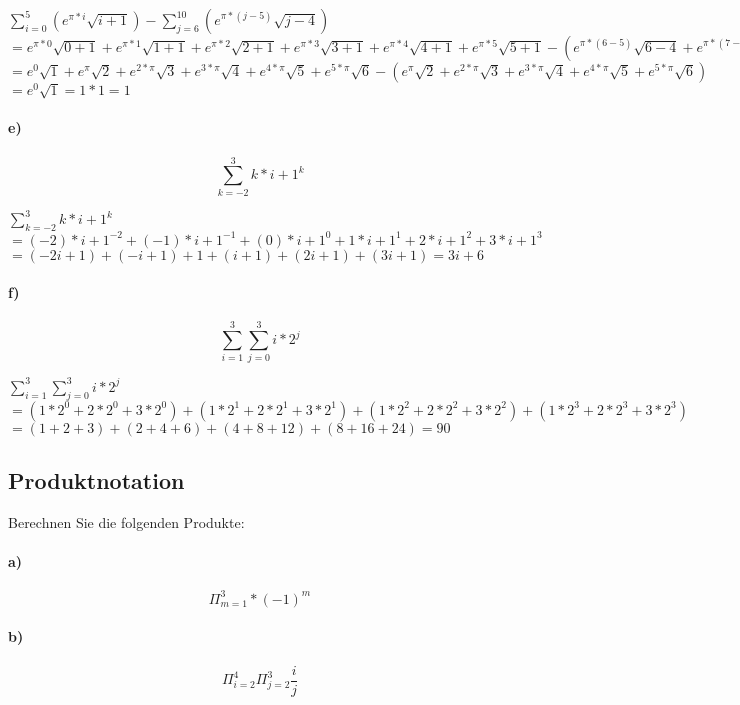 \documentclass[paper=a4, fontsize=11pt]{scrartcl}
\numberwithin{equation}{section}
\numberwithin{figure}{section}
\numberwithin{table}{section}
\begin{document}
$\sum^{5}_{i=0}(e^{\pi *i} \sqrt{i+1})-\sum^{10}_{j=6}(e^{\pi *(j-5)} \sqrt{j-4})$ \\
$=
e^{\pi *0} \sqrt{0+1} + e^{\pi *1} \sqrt{1+1}
+ e^{\pi *2} \sqrt{2+1} + e^{\pi *3} \sqrt{3+1}
+ e^{\pi *4} \sqrt{4+1} + e^{\pi *5} \sqrt{5+1} 
- (e^{\pi *(6-5)} \sqrt{6-4} + e^{\pi *(7-5)} \sqrt{7-4} + e^{\pi *(8-5)} \sqrt{8-4} 
+ e^{\pi *(9-5)} \sqrt{9-4} + e^{\pi *(10-5)} \sqrt{10-4})$ \\
$=
e^{0} \sqrt{1} + e^{\pi} \sqrt{2} +  e^{2* \pi} \sqrt{3} +  e^{3* \pi} \sqrt{4} +  e^{4* \pi} \sqrt{5}
+  e^{5* \pi} \sqrt{6}
-( e^{\pi} \sqrt{2} +  e^{2* \pi} \sqrt{3}
+  e^{3* \pi} \sqrt{4} +  e^{4* \pi} \sqrt{5}
+  e^{5* \pi} \sqrt{6})  $ \\
$=
e^{0} \sqrt{1} = 1*1 = 1 $

\paragraph{e)}
$$\sum^{3}_{k=-2}k*i+1^{k}$$

$\sum^{3}_{k=-2}k*i+1^{k}$ \\
$=
(-2)*i+1^{-2} + (-1)*i+1^{-1} + (0)*i+1^{0}
+ 1*i+1^{1} + 2*i+1^{2} + 3*i+1^{3}$ \\
$=
(-2i+1)+(-i+1)+1+(i+1)+(2i+1)+(3i+1) = 3i+6
$
\paragraph{f)}
$$\sum^{3}_{i=1} \sum^{3}_{j=0}i*2^{j}$$

$\sum^{3}_{i=1} \sum^{3}_{j=0}i*2^{j}$ \\
$=
(1*2^{0}+2*2^{0}+3*2^{0})
+(1*2^{1}+2*2^{1}+3*2^{1})
+(1*2^{2}+2*2^{2}+3*2^{2})
+(1*2^{3}+2*2^{3}+3*2^{3})$ \\
$=
(1+2+3)+(2+4+6)+(4+8+12)+(8+16+24) = 90$
\subsection{Produktnotation}
Berechnen Sie die folgenden Produkte:
\paragraph{a)}
$$\Pi^{3}_{m=1}*(-1)^{m}$$

\paragraph{b)}
$$\Pi^{4}_{i=2} \Pi^{3}_{j=2} \dfrac{i}{j}$$
\end{document}
